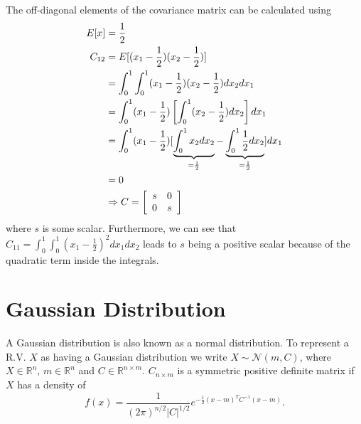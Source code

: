 \documentclass[lecture,12pt,]{pcms-l}
\begin{document}
The off-diagonal elements of the covariance matrix can be calculated using
\begin{align*}
E[x] &= \frac{1}{2} \\
C_{12} &= E[(x_1 - \frac{1}{2})(x_2 - \frac{1}{2})] \\
&= \int_0^1 \int_0^1 (x_1 - \frac{1}{2})(x_2 - \frac{1}{2})dx_2dx_1 \\
&= \int_0^1 (x_1 - \frac{1}{2})\left[\int_0^1 (x_2 - \frac{1}{2})dx_2\right]dx_1 \\
&= \int_0^1 (x_1 - \frac{1}{2})[\underbrace{\int_0^1 x_2dx_2}_{= \frac{1}{2}} - \underbrace{\int_0^1 \frac{1}{2}dx_2}_{= \frac{1}{2}}]dx_1 \\
&= 0 \\
&\Rightarrow C = \left[\begin{array}{c c}
                         s & 0 \\ 0 & s
                       \end{array}\right]
\end{align*}
where $s$ is some scalar. Furthermore, we can see that \\
$C_{11} = \int_0^1\int_0^1(x_1-\frac{1}{2})^2dx_1dx_2$ leads to $s$ being a positive scalar because of the quadratic term inside the integrals.

\section{Gaussian Distribution}
A Gaussian distribution is also known as a normal distribution. To represent a R.V. $X$ as having a Gaussian distribution we write $X \sim \mathcal{N}(m,C)$, where $X \in \mathbb{R}^n$, $m \in \mathbb{R}^n$ and $C \in \mathbb{R}^{n \times m}$. $C_{n \times m}$ is a symmetric positive definite matrix if $X$ has a density of
$$f(x) = \frac{1}{(2\pi)^{n/2}|C|^{1/2}}e^{-\frac{1}{2}(x-m)^TC^{-1}(x-m)}.$$
\end{document}
